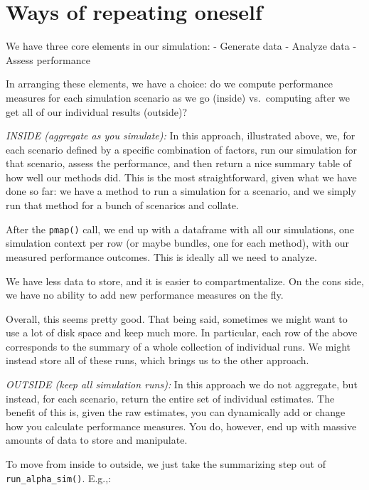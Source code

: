 \documentclass[
]{book}
\begin{document}
\hypertarget{ways-of-repeating-oneself}{%
\section{Ways of repeating oneself}\label{ways-of-repeating-oneself}}

We have three core elements in our simulation:
- Generate data
- Analyze data
- Assess performance

In arranging these elements, we have a choice: do we compute performance measures for each simulation scenario as we go (inside) vs.~computing after we get all of our individual results (outside)?

\emph{INSIDE (aggregate as you simulate):}
In this approach, illustrated above, we, for each scenario defined by a specific combination of factors, run our simulation for that scenario, assess the performance, and then return a nice summary table of how well our methods did.
This is the most straightforward, given what we have done so far: we have a method to run a simulation for a scenario, and we simply run that method for a bunch of scenarios and collate.

After the \texttt{pmap()} call, we end up with a dataframe with all our simulations, one simulation context per row (or maybe bundles, one for each method), with
our measured performance outcomes. This is ideally all we need to analyze.

We have less data to store, and it is easier to compartmentalize.
On the cons side, we have no ability to add new performance measures on the fly.

Overall, this seems pretty good.
That being said, sometimes we might want to use a lot of disk space and keep
much more. In particular, each row of the above corresponds to the summary
of a whole collection of individual runs. We might instead store all of
these runs, which brings us to the other approach.

\emph{OUTSIDE (keep all simulation runs):}
In this approach we do not aggregate, but instead, for each scenario, return the entire set of individual estimates.
The benefit of this is, given the raw estimates, you can dynamically add or change how you calculate performance measures.
You do, however, end up with massive amounts of data to store and manipulate.

To move from inside to outside, we just take the summarizing step out of \texttt{run\_alpha\_sim()}.
E.g.,:
\end{document}
